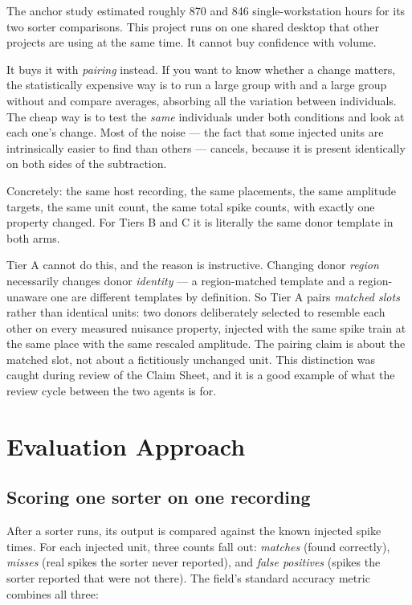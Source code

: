 \documentclass[12pt]{article}
\begin{document}
The anchor study estimated roughly 870 and 846 single-workstation hours for its two sorter
comparisons. This project runs on one shared desktop that other projects are using at the
same time. It cannot buy confidence with volume.

It buys it with \emph{pairing} instead. If you want to know whether a change matters, the
statistically expensive way is to run a large group with and a large group without and
compare averages, absorbing all the variation between individuals. The cheap way is to test
the \emph{same} individuals under both conditions and look at each one's change. Most of the
noise --- the fact that some injected units are intrinsically easier to find than others ---
cancels, because it is present identically on both sides of the subtraction.

Concretely: the same host recording, the same placements, the same amplitude targets, the same
unit count, the same total spike counts, with exactly one property changed. For Tiers B and C
it is literally the same donor template in both arms.

Tier A cannot do this, and the reason is instructive. Changing donor \emph{region}
necessarily changes donor \emph{identity} --- a region-matched template and a region-unaware
one are different templates by definition. So Tier A pairs \emph{matched slots} rather than
identical units: two donors deliberately selected to resemble each other on every measured
nuisance property, injected with the same spike train at the same place with the same
rescaled amplitude. The pairing claim is about the matched slot, not about a fictitiously
unchanged unit. This distinction was caught during review of the Claim Sheet, and it is a
good example of what the review cycle between the two agents is for.

\section{Evaluation Approach}

\subsection{Scoring one sorter on one recording}

After a sorter runs, its output is compared against the known injected spike times. For each
injected unit, three counts fall out: \emph{matches} (found correctly), \emph{misses} (real
spikes the sorter never reported), and \emph{false positives} (spikes the sorter reported
that were not there). The field's standard accuracy metric combines all three:
\end{document}

